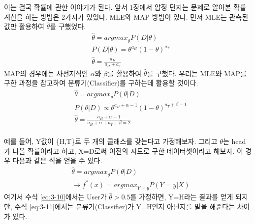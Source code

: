 \documentclass[a4paper]{oblivoir}
\begin{document}
\indent 이는 결국 확률에 관한 이야기가 된다. 앞서 1장에서 압정 던지는 문제로 알아본 확률 계산을 하는 방법은 2가지가 있었다. MLE와 MAP 방법이 있다. 먼저 MLE는 관측된 값만 활용하여 $\hat{\theta}$를 구했었다.
\begin{align}
&\hat{\theta}={argmax}_{\theta}P(D| \theta)\label{eq:3-4}\\
&P(D| \theta)=\theta^{a_H}(1-\theta)^{a_T}\label{eq:3-5}\\
&\hat{\theta}=\frac{a_H}{a_H+a_T}\label{eq:3-6}
\end{align}
\indent MAP의 경우에는 사전지식인 $\alpha$와 $\beta$를 활용하여 $\hat{\theta}$를 구했다. 우리는 MLE와 MAP를 구한 과정을 참고하여 분류기(Classifier)를 구하는데 활용할 것이다.
\begin{align}
&\hat{\theta}={argmax}_{\theta}P(\theta|D)\label{eq:3-7}\\
&P(\theta| D) \propto \theta^{a_H+\alpha-1}(1-\theta)^{a_T+\beta-1}\label{eq:3-8}\\
&\hat{\theta}=\frac{a_H+\alpha-1}{a_H+\alpha+a_T+\beta=2}\label{eq:3-9}
\end{align}
\\
\indent 예를 들어, Y값이 \{H,T\}로 두 개의 클래스를 갖는다고 가정해보자. 그리고 $\theta$는 head가 나올 확률이라고 하고, X=D로써 이전의 시도로 구한 데이터셋이라고 해보자. 이 경우 다음과 같은 식을 얻을 수 있다.
\begin{align}
&\hat{\theta}={argmax}_{\theta} P(\theta| D) \label{eq:3-10}\\
&\rightarrow f^*(x)={argmax}_{Y=y}P(Y=y|X) \label{eq:3-11}
\end{align}
여기서 수식 \eqref{eq:3-10}에서는 User가 $\hat{\theta}>0.5$를 가정하면, Y=H라는 결과를 얻게 되지만, 수식 \eqref{eq:3-11}에서는 분류기(Classifier)가 Y=H인지 아닌지를 말을 해준다는 차이가 있다.\\

\end{document}
